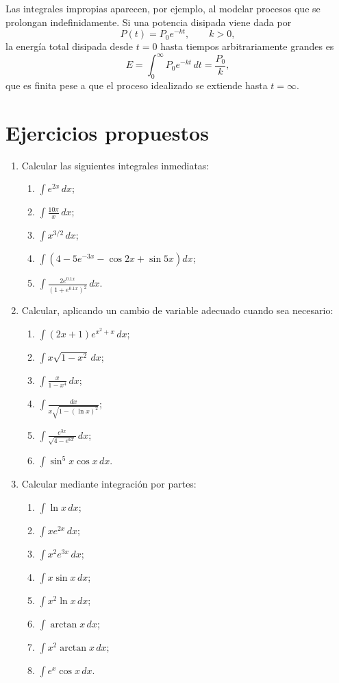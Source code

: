 Las integrales impropias aparecen, por ejemplo, al modelar procesos que se prolongan indefinidamente. Si una potencia disipada viene dada por
\[
P(t)=P_0e^{-kt},\qquad k>0,
\]
la energía total disipada desde $t=0$ hasta tiempos arbitrariamente grandes es
\[
E=\int_0^{\infty}P_0e^{-kt}\,dt
=\frac{P_0}{k},
\]
que es finita pese a que el proceso idealizado se extiende hasta $t=\infty$.

\section*{Ejercicios propuestos}

\begin{enumerate}

\item Calcular las siguientes integrales inmediatas:
\begin{enumerate}[label=\alph*)]
\item $\displaystyle\int e^{2x}\,dx$;
\item $\displaystyle\int\frac{10\pi}{x}\,dx$;
\item $\displaystyle\int x^{3/2}\,dx$;
\item $\displaystyle\int\left(4-5e^{-3x}-\cos2x+\sin5x\right)dx$;
\item $\displaystyle\int\frac{2e^{0.1x}}{(1+e^{0.1x})^2}\,dx$.
\end{enumerate}

\item Calcular, aplicando un cambio de variable adecuado cuando sea necesario:
\begin{enumerate}[label=\alph*)]
\item $\displaystyle\int(2x+1)e^{x^2+x}\,dx$;
\item $\displaystyle\int x\sqrt{1-x^2}\,dx$;
\item $\displaystyle\int\frac{x}{1-x^4}\,dx$;
\item $\displaystyle\int\frac{dx}{x\sqrt{1-(\ln x)^2}}$;
\item $\displaystyle\int\frac{e^{3x}}{\sqrt{4-e^{6x}}}\,dx$;
\item $\displaystyle\int \sin^5x\cos x\,dx$.
\end{enumerate}

\item Calcular mediante integración por partes:
\begin{enumerate}[label=\alph*)]
\item $\displaystyle\int\ln x\,dx$;
\item $\displaystyle\int xe^{2x}\,dx$;
\item $\displaystyle\int x^2e^{3x}\,dx$;
\item $\displaystyle\int x\sin x\,dx$;
\item $\displaystyle\int x^2\ln x\,dx$;
\item $\displaystyle\int\arctan x\,dx$;
\item $\displaystyle\int x^2\arctan x\,dx$;
\item $\displaystyle\int e^x\cos x\,dx$.
\end{enumerate}


\end{enumerate}
